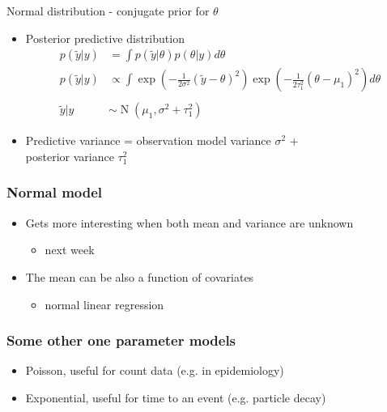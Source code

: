\documentclass[english,t]{beamer}
\DeclareMathOperator{\N}{N}
\begin{document}
\begin{frame}{Normal distribution - conjugate prior for $\theta$}

  \begin{itemize}
  \item Posterior predictive distribution
    \begin{align*}
      p(\tilde{y}|y)&=\int p(\tilde{y}|\theta)p(\theta|y) d\theta \\
      p(\tilde{y}|y)& \propto\int
      \exp\left(-\frac{1}{2\sigma^2}(\tilde{y}-\theta)^2\right)\exp\left(-\frac{1}{2\tau_1^2}(\theta-\mu_1)^2\right) d\theta \\
      ~&~\\ 
      \tilde{y}|y &\sim \N(\mu_1,\sigma^2+\tau_1^2)
    \end{align*}
  \item Predictive variance = observation model variance $\sigma^2$ + \\
     posterior variance $\tau_1^2$

  \end{itemize}

\end{frame}

 \begin{frame}
   \frametitle{Normal model}

   \begin{itemize}
   \item Gets more interesting when both mean and variance are unknown
     \begin{itemize}
     \item next week
     \end{itemize}
   \item<2-> The mean can be also a function of covariates
     \begin{itemize}
     \item normal linear regression
     \end{itemize}
   \end{itemize}
 \end{frame}

 \begin{frame}
   \frametitle{Some other one parameter models}

   \begin{itemize}
   \item Poisson, useful for count data (e.g. in epidemiology)
   \item Exponential, useful for time to an event (e.g. particle decay)
   \end{itemize}
   
 \end{frame}
\end{document}
